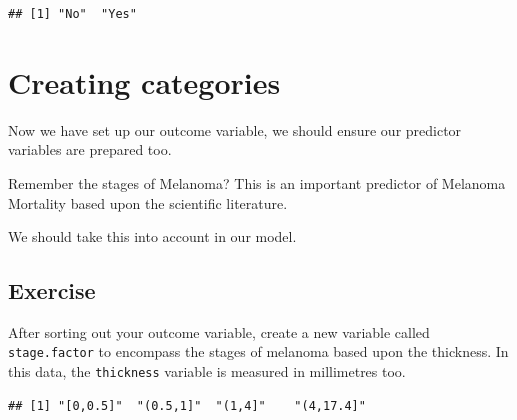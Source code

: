 \documentclass[]{book}
\makeatletter
\newenvironment{Shaded}{\begin{snugshade}}{\end{snugshade}}
\newcommand{\KeywordTok}[1]{\textcolor[rgb]{0.13,0.29,0.53}{\textbf{#1}}}
\newcommand{\DataTypeTok}[1]{\textcolor[rgb]{0.13,0.29,0.53}{#1}}
\newcommand{\DecValTok}[1]{\textcolor[rgb]{0.00,0.00,0.81}{#1}}
\newcommand{\FloatTok}[1]{\textcolor[rgb]{0.00,0.00,0.81}{#1}}
\newcommand{\StringTok}[1]{\textcolor[rgb]{0.31,0.60,0.02}{#1}}
\newcommand{\CommentTok}[1]{\textcolor[rgb]{0.56,0.35,0.01}{\textit{#1}}}
\newcommand{\OperatorTok}[1]{\textcolor[rgb]{0.81,0.36,0.00}{\textbf{#1}}}
\newcommand{\NormalTok}[1]{#1}
\newenvironment{kframe}{%
\medskip{}
\setlength{\fboxsep}{.8em}
 \def\at@end@of@kframe{}%
 \ifinner\ifhmode%
  \def\at@end@of@kframe{\end{minipage}}%
  \begin{minipage}{\columnwidth}%
 \fi\fi%
 \def\FrameCommand##1{\hskip\@totalleftmargin \hskip-\fboxsep
 \colorbox{shadecolor}{##1}\hskip-\fboxsep
     \hskip-\linewidth \hskip-\@totalleftmargin \hskip\columnwidth}%
 \MakeFramed {\advance\hsize-\width
   \@totalleftmargin\z@ \linewidth\hsize
   \@setminipage}}%
 {\par\unskip\endMakeFramed%
 \at@end@of@kframe}
\renewenvironment{Shaded}{\begin{kframe}}{\end{kframe}}
\makeatother
\begin{document}
\begin{verbatim}
## [1] "No"  "Yes"
\end{verbatim}

\section{Creating categories}\label{creating-categories}

Now we have set up our outcome variable, we should ensure our predictor
variables are prepared too.

Remember the stages of Melanoma? This is an important predictor of
Melanoma Mortality based upon the scientific literature.

We should take this into account in our model.

\subsection{Exercise}\label{exercise-43}

After sorting out your outcome variable, create a new variable called
\texttt{stage.factor} to encompass the stages of melanoma based upon the
thickness. In this data, the \texttt{thickness} variable is measured in
millimetres too.

\begin{Shaded}
\end{Shaded}

\begin{verbatim}
## [1] "[0,0.5]"  "(0.5,1]"  "(1,4]"    "(4,17.4]"
\end{verbatim}
\end{document}
